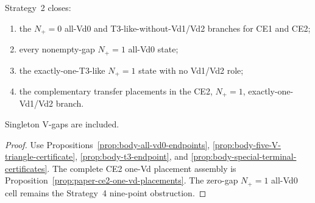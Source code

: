 \begin{proposition}
\label{prop:body-demand-branches}
Strategy~2 closes:
\begin{enumerate}
\item the \(N_+=0\) all-Vd0 and T3-like-without-Vd1/Vd2 branches for CE1 and
CE2;
\item every nonempty-gap \(N_+=1\) all-Vd0 state;
\item the exactly-one-T3-like \(N_+=1\) state with no Vd1/Vd2 role;
\item the complementary transfer placements in the CE2, \(N_+=1\),
exactly-one-Vd1/Vd2 branch.
\end{enumerate}
Singleton V-gaps are included.
\end{proposition}

\begin{proof}
Use Propositions~\ref{prop:body-all-vd0-endpoints},
\ref{prop:body-five-V-triangle-certificate},
\ref{prop:body-t3-endpoint}, and
\ref{prop:body-special-terminal-certificates}.  The complete CE2 one-Vd
placement assembly is Proposition~\ref{prop:paper-ce2-one-vd-placements}.
The zero-gap \(N_+=1\) all-Vd0 cell remains the Strategy~4 nine-point
obstruction.
\end{proof}
